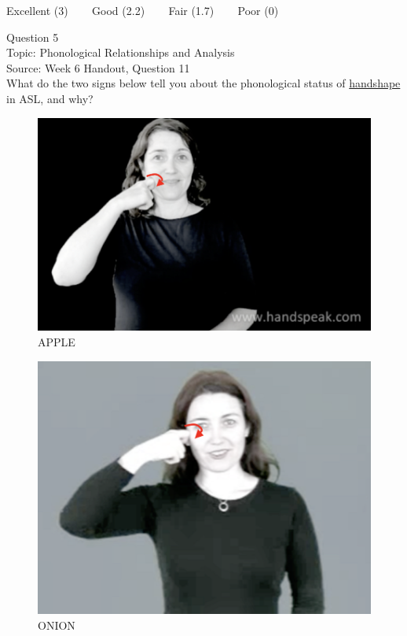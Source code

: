 \documentclass[12pt]{article}
\begin{document}
\vfill
Excellent (3) ~~~ Good (2.2) ~~~ Fair (1.7) ~~~ Poor (0)
\newpage

{\large Question 5}\\

Topic: Phonological Relationships and Analysis\\
Source: Week 6 Handout, Question 11\\

What do the two signs below tell you about the phonological status of \underline{handshape} in ASL, and why?\\

\begin{figure}[H]
\includegraphics{../images/asl_apple.png}
\caption{APPLE}
\end{figure}
\begin{figure}[H]
\includegraphics{../images/asl_onion.png}
\caption{ONION}
\end{figure}
\end{document}
